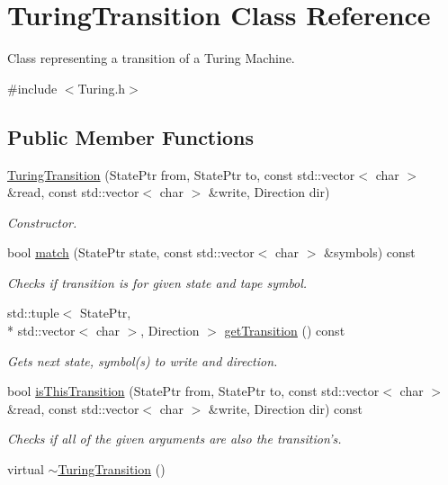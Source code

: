 \hypertarget{class_turing_transition}{\section{Turing\-Transition Class Reference}
\label{class_turing_transition}
}


Class representing a transition of a Turing Machine.  




{\ttfamily \#include $<$Turing.\-h$>$}

\subsection*{Public Member Functions}
\begin{DoxyCompactItemize}
\item 
\hyperlink{class_turing_transition_a60df5eef7134bdcc7409358f4f4a8e4e}{Turing\-Transition} (State\-Ptr from, State\-Ptr to, const std\-::vector$<$ char $>$ \&read, const std\-::vector$<$ char $>$ \&write, Direction dir)
\begin{DoxyCompactList}\small\item\em Constructor. \end{DoxyCompactList}\item 
bool \hyperlink{class_turing_transition_a3abcfe319f73bc78ac9d010007f922b2}{match} (State\-Ptr state, const std\-::vector$<$ char $>$ \&symbols) const 
\begin{DoxyCompactList}\small\item\em Checks if transition is for given state and tape symbol. \end{DoxyCompactList}\item 
std\-::tuple$<$ State\-Ptr, \\*
std\-::vector$<$ char $>$, Direction $>$ \hyperlink{class_turing_transition_a7f3ad7a3bfa9386e5607fdb108f36dae}{get\-Transition} () const 
\begin{DoxyCompactList}\small\item\em Gets next state, symbol(s) to write and direction. \end{DoxyCompactList}\item 
bool \hyperlink{class_turing_transition_aa94e95235a7c4140d4c23cb252185900}{is\-This\-Transition} (State\-Ptr from, State\-Ptr to, const std\-::vector$<$ char $>$ \&read, const std\-::vector$<$ char $>$ \&write, Direction dir) const 
\begin{DoxyCompactList}\small\item\em Checks if all of the given arguments are also the transition's. \end{DoxyCompactList}\item 
virtual \hyperlink{class_turing_transition_a864a90c01b40bfa7cdcf545980d0f546}{$\sim$\-Turing\-Transition} ()
\end{DoxyCompactItemize}
